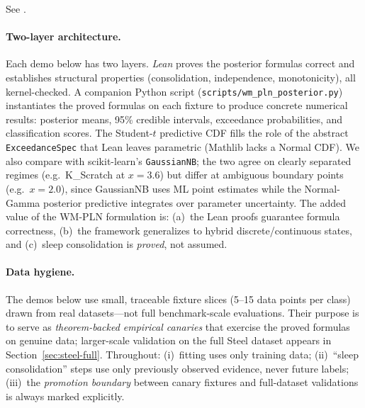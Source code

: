 \documentclass[11pt,openany]{report}
\begin{document}
See .


\paragraph{Two-layer architecture.}
\label{sec:two-layer}
Each demo below has two layers.
\emph{Lean} proves the posterior formulas correct and establishes
structural properties (consolidation, independence, monotonicity),
all kernel-checked.  A companion Python script
(\texttt{scripts/wm\_pln\_posterior.py}) instantiates the proved
formulas on each fixture to produce concrete numerical results:
posterior means, 95\% credible intervals, exceedance probabilities,
and classification scores.  The Student-$t$ predictive CDF fills the
role of the abstract \texttt{ExceedanceSpec} that Lean leaves parametric
(Mathlib lacks a Normal CDF).  We also compare with scikit-learn's
\texttt{GaussianNB}; the two agree on clearly separated regimes
(e.g.\ K\_Scratch at $x=3.6$) but differ at ambiguous boundary
points (e.g.\ $x=2.0$), since GaussianNB uses ML point estimates
while the Normal-Gamma posterior predictive integrates over parameter
uncertainty.  The added value of the WM-PLN formulation is:
(a)~the Lean proofs guarantee formula correctness,
(b)~the framework generalizes to hybrid discrete/continuous states, and
(c)~sleep consolidation is \emph{proved}, not assumed.
\paragraph{Data hygiene.}
The demos below use small, traceable fixture slices
(5--15 data points per class) drawn from real datasets---not
full benchmark-scale evaluations.  Their purpose is to serve as
\emph{theorem-backed empirical canaries} that exercise the proved formulas
on genuine data; larger-scale validation on the full Steel dataset
appears in Section~\ref{sec:steel-full}.  Throughout:
(i)~fitting uses only training data;
(ii)~``sleep consolidation'' steps use only previously observed evidence,
never future labels;
(iii)~the \emph{promotion boundary} between canary fixtures and
full-dataset validations is always marked explicitly.
\end{document}
